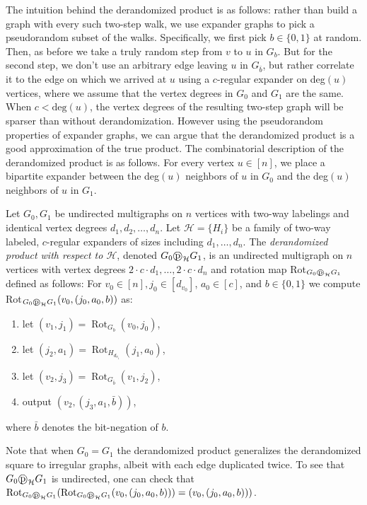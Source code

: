 \documentclass{toc}
\newcommand{\dpr}{\text{\textcircled{p}}_{\mathcal{H}}}
\numberwithin{myalgctr}{section}
\theoremstyle{named}
\begin{document}
The intuition behind the derandomized product is as follows: rather than build a graph with every such two-step walk, we use expander graphs to pick a pseudorandom subset of the walks.  Specifically, we first pick $b\in\{0,1\}$ at random. Then, as before we take a truly random step from $v$ to $u$ in $G_b$. But for the second step, we don't use an arbitrary edge leaving $u$ in $G_{\bar{b}}$, but rather correlate it to the edge on which we arrived at $u$ using a $c$-regular expander on deg$(u)$ vertices, where we assume that the vertex degrees in $G_0$ and $G_1$ are the same. When $c<\mathrm{deg}(u)$, the vertex degrees of the resulting two-step graph will be sparser than without derandomization. However using the pseudorandom properties of expander graphs, we can argue that the derandomized product is a good approximation of the true product. The combinatorial description of the derandomized product is as follows. For every vertex $u\in[n]$, we place a bipartite expander between the deg$(u)$ neighbors of $u$ in $G_0$ and the deg$(u)$ neighbors of $u$ in $G_1$.  

\begin{definition}
\label{def:derandproduct}
Let $G_0, G_1$ be undirected multigraphs on $n$ vertices with two-way labelings and identical vertex degrees $d_1,d_2,\ldots,d_n$. Let $\mathcal{H}=\{H_i\}$ be a family of two-way labeled, $c$-regular expanders of sizes including $d_1,\ldots,d_n$. The \emph{derandomized product with respect to $\mathcal{H}$}, denoted $G_0\dpr G_1$, is an undirected multigraph on $n$ vertices with vertex degrees $2\cdot c\cdot d_1,\ldots,2\cdot c\cdot d_n$ and rotation map Rot$_{G_0\dpr G_1}$ defined as follows: For $v_{0}\in[n], j_0\in[d_{v_0}]$, $a_0\in [c]$, and $b\in\{0,1\}$ we compute Rot$_{G_0\dpr G_1}(v_0,(j_0,a_0,b))$ as:
\begin{enumerate}
\item let $(v_1,j_1)=\operatorname{Rot}_{G_b}(v_0,j_0)$,
\item let $(j_2,a_1)=\operatorname{Rot}_{H_{d_{v_{1}}}}(j_1,a_0)$,
\item let $(v_2,j_3)=\operatorname{Rot}_{G_{\bar{b}}}(v_1,j_2)$,
\item output $(v_2,(j_3,a_1,\bar{b}))$,
\end{enumerate}
where $\bar{b}$ denotes the bit-negation of $b$. 
\end{definition}
Note that when $G_0=G_1$ the derandomized product generalizes the derandomized square \cite{RozenmanVa05} to irregular graphs, albeit with each edge duplicated twice. To see that $G_0\dpr G_1$ is undirected, one can check that $\mathrm{Rot}_{G_0\dpr G_1}(\mathrm{Rot}_{G_0\dpr G_1}(v_0,(j_0,a_0,b)))=(v_0,(j_0,a_0,b)))$.
\end{document}
